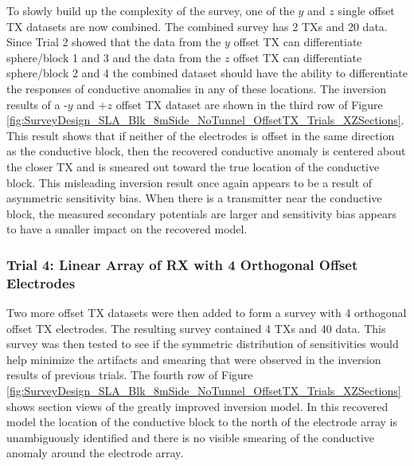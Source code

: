 \documentclass[preprint,authoryear,12pt]{elsarticle}
\begin{document}
To slowly build up the complexity of the survey, one of the $y$ and $z$ single offset TX datasets are now combined. The combined survey has 2 TXs and 20 data. Since Trial 2 showed that the data from the $y$ offset TX can differentiate sphere/block 1 and 3 and the data from the $z$ offset TX can differentiate sphere/block 2 and 4 the combined dataset should have the ability to differentiate the responses of conductive anomalies in any of these locations. The inversion results of a -$y$ and $+z$ offset TX dataset are shown in the third row of Figure \ref{fig:SurveyDesign_SLA_Blk_8mSide_NoTunnel_OffsetTX_Trials_XZSections}. This result shows that if neither of the electrodes is offset in the same direction as the conductive block, then the recovered conductive anomaly is centered about the closer TX and is smeared out toward the true location of the conductive block. This misleading inversion result once again appears to be a result of asymmetric sensitivity bias. When there is a transmitter near the conductive block, the measured secondary potentials are larger and sensitivity bias appears to have a smaller impact on the recovered model.


\subsubsection{Trial 4: Linear Array of RX with 4 Orthogonal Offset Electrodes}
\label{sec:TheoreticalAnalysis_Trial4_4OrthogElecOffset}
Two more offset TX datasets were then added to form a survey with 4 orthogonal offset TX electrodes. The resulting survey contained 4 TXs and 40 data. This survey was then tested to see if the symmetric distribution of sensitivities would help minimize the artifacts and smearing that were observed in the inversion results of previous trials. The fourth row of Figure \ref{fig:SurveyDesign_SLA_Blk_8mSide_NoTunnel_OffsetTX_Trials_XZSections} shows section views of the greatly improved inversion model. In this recovered model the location of the conductive block to the north of the electrode array is unambiguously identified and there is no visible smearing of the conductive anomaly around the electrode array.
\end{document}
